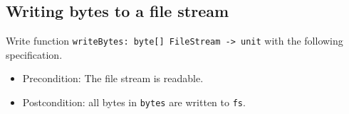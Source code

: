 \subsection*{Writing bytes to a file stream}

Write function \texttt{writeBytes: byte[] FileStream -> unit} with the following specification.  
\begin{itemize}
\item Precondition: The file stream is readable.
\item Postcondition: all bytes in \texttt{bytes} are written to \texttt{fs}.
\end{itemize}
